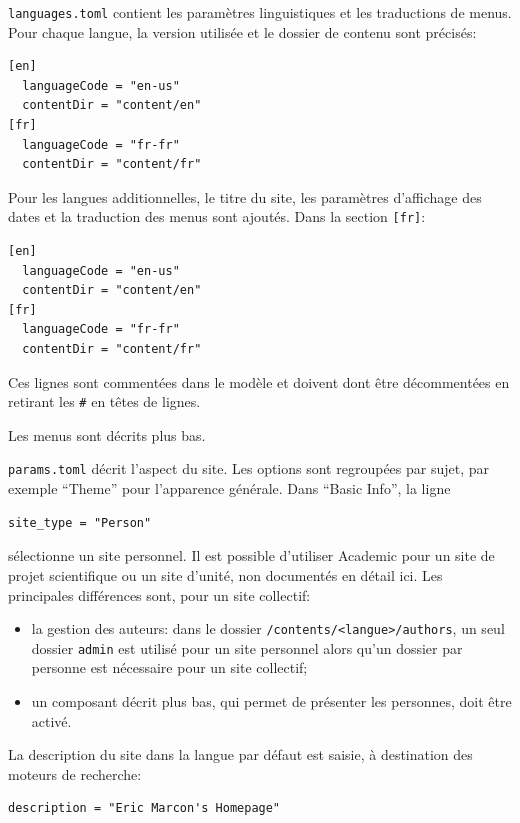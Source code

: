 \documentclass[
  12pt,
  french,
  a4paper,
  extrafontsizes,onecolumn,openright
  ]{memoir}
\providecommand{\tightlist}{%
  \setlength{\itemsep}{0pt}\setlength{\parskip}{0pt}}
\begin{document}
\texttt{languages.toml} contient les paramètres linguistiques et les traductions de menus.
Pour chaque langue, la version utilisée et le dossier de contenu sont précisés:

\begin{verbatim}
[en]
  languageCode = "en-us"
  contentDir = "content/en"
[fr]
  languageCode = "fr-fr"
  contentDir = "content/fr"
\end{verbatim}

Pour les langues additionnelles, le titre du site, les paramètres d'affichage des dates et la traduction des menus sont ajoutés.
Dans la section \texttt{{[}fr{]}}:

\begin{verbatim}
[en]
  languageCode = "en-us"
  contentDir = "content/en"
[fr]
  languageCode = "fr-fr"
  contentDir = "content/fr"
\end{verbatim}

Ces lignes sont commentées dans le modèle et doivent dont être décommentées en retirant les \texttt{\#} en têtes de lignes.

Les menus sont décrits plus bas.

\texttt{params.toml} décrit l'aspect du site.
Les options sont regroupées par sujet, par exemple \enquote{Theme} pour l'apparence générale.
Dans \enquote{Basic Info}, la ligne

\begin{verbatim}
site_type = "Person"
\end{verbatim}

sélectionne un site personnel.
Il est possible d'utiliser Academic pour un site de projet scientifique ou un site d'unité, non documentés en détail ici.
Les principales différences sont, pour un site collectif:

\begin{itemize}
\tightlist
\item
  la gestion des auteurs: dans le dossier \texttt{/contents/\textless{}langue\textgreater{}/authors}, un seul dossier \texttt{admin} est utilisé pour un site personnel alors qu'un dossier par personne est nécessaire pour un site collectif;
\item
  un composant décrit plus bas, qui permet de présenter les personnes, doit être activé.
\end{itemize}

La description du site dans la langue par défaut est saisie, à destination des moteurs de recherche:

\begin{verbatim}
description = "Eric Marcon's Homepage"
\end{verbatim}
\end{document}
